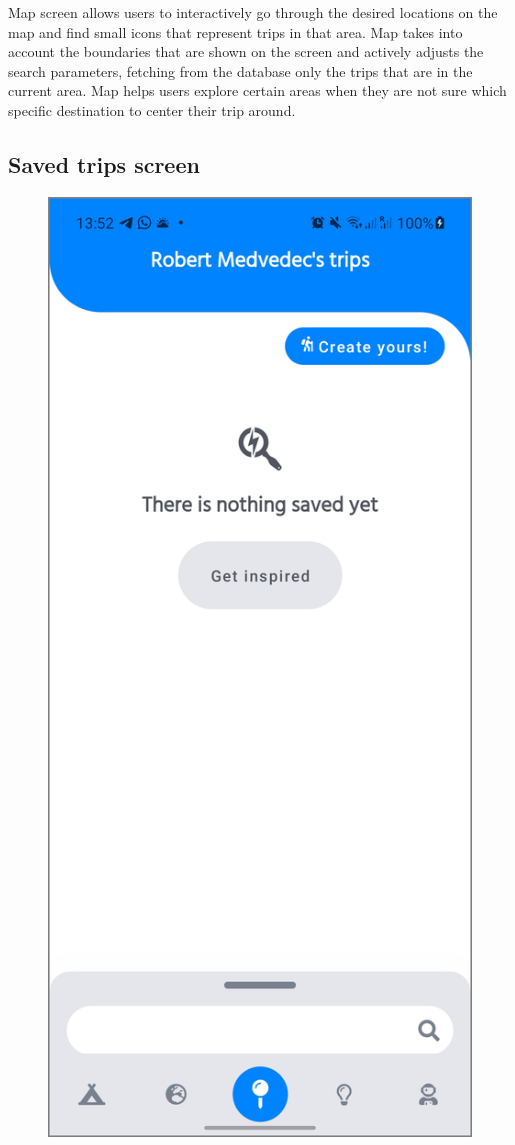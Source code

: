 Map screen allows users to interactively go through the desired locations on the map and find small icons that represent trips in that area. Map takes into account the boundaries that are shown on the screen and actively adjusts the search parameters, fetching from the database only the trips that are in the current area. Map helps users explore certain areas when they are not sure which specific destination to center their trip around.
\newpage

\subsection{Saved trips screen}
\begin{figure}[!htb]
\centering
\begin{minipage}{.48\textwidth}
\centering
\includegraphics[width=.9\textwidth]{../Images/UI/SavedTripsLight.jpg}

\end{minipage}
\end{figure}
